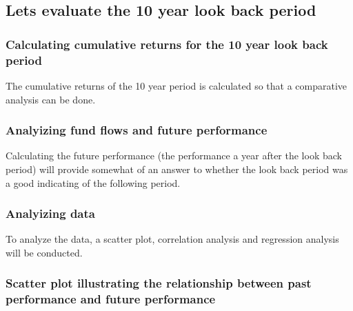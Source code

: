 \documentclass[11pt,preprint, authoryear]{elsarticle}
\numberwithin{equation}{section}
\numberwithin{figure}{section}
\numberwithin{table}{section}
\begin{document}
\hypertarget{lets-evaluate-the-10-year-look-back-period}{%
\subsection{Lets evaluate the 10 year look back
period}\label{lets-evaluate-the-10-year-look-back-period}}

\hypertarget{calculating-cumulative-returns-for-the-10-year-look-back-period}{%
\subsubsection{Calculating cumulative returns for the 10 year look back
period}\label{calculating-cumulative-returns-for-the-10-year-look-back-period}}

The cumulative returns of the 10 year period is calculated so that a
comparative analysis can be done.

\hypertarget{analyizing-fund-flows-and-future-performance-1}{%
\subsubsection{Analyizing fund flows and future
performance}\label{analyizing-fund-flows-and-future-performance-1}}

Calculating the future performance (the performance a year after the
look back period) will provide somewhat of an answer to whether the look
back period was a good indicating of the following period.

\hypertarget{analyizing-data-1}{%
\subsubsection{Analyizing data}\label{analyizing-data-1}}

To analyze the data, a scatter plot, correlation analysis and regression
analysis will be conducted.

\hypertarget{scatter-plot-illustrating-the-relationship-between-past-performance-and-future-performance-1}{%
\subsubsection{Scatter plot illustrating the relationship between past
performance and future
performance}\label{scatter-plot-illustrating-the-relationship-between-past-performance-and-future-performance-1}}
\end{document}
